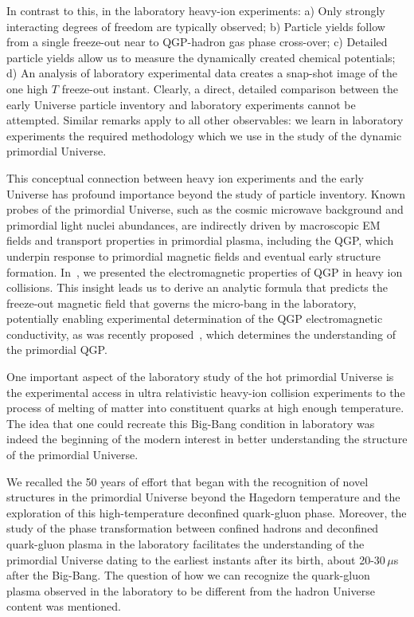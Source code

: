 {\color{black}In contrast to this, in the laboratory heavy-ion experiments: a) Only strongly interacting degrees of freedom are typically observed; b) Particle yields follow from a single freeze-out near to QGP-hadron gas phase cross-over; c) Detailed particle yields allow us to measure the dynamically created chemical potentials; d) An analysis of laboratory experimental data creates a snap-shot image of the one high $T$ freeze-out instant. Clearly, a direct, detailed comparison between the early Universe particle inventory and laboratory experiments cannot be attempted. Similar remarks apply to all other observables: we learn in laboratory experiments the required methodology which we use in the study of the dynamic primordial Universe.}

{\color{black} This conceptual connection between heavy ion experiments and the early Universe has profound importance beyond the study of particle inventory. Known probes of the primordial Universe, such as the cosmic microwave background and primordial light nuclei abundances, are indirectly driven by macroscopic EM fields and transport properties in primordial plasma, including the QGP, which underpin response to primordial magnetic fields and eventual early structure formation. In~, we presented the electromagnetic properties of QGP in heavy ion collisions. This insight leads us to derive an analytic formula that predicts the freeze-out magnetic field that governs the micro-bang in the laboratory, potentially enabling experimental determination of the QGP electromagnetic conductivity, as was recently proposed~\cite{STAR:2023jdd}, which determines the  understanding of the primordial QGP.}

One important aspect of the laboratory study of the hot primordial Universe is the experimental access in ultra relativistic heavy-ion collision experiments to the process of melting of matter into constituent quarks at high enough temperature. The idea that one could recreate this Big-Bang condition in laboratory was indeed the beginning of the modern interest in better understanding the structure of the primordial Universe. 

We recalled the 50 years of effort that began with the recognition of novel structures in the primordial Universe beyond the Hagedorn temperature and the exploration of this high-temperature deconfined quark-gluon phase. Moreover, the study of the phase transformation between confined hadrons and deconfined quark-gluon plasma in the laboratory facilitates the understanding of the primordial Universe dating to the earliest instants after its birth, about 20-30\,$\mu$s after the Big-Bang. The question of how we can recognize the quark-gluon plasma observed in the laboratory to be different from the hadron Universe content was mentioned.

